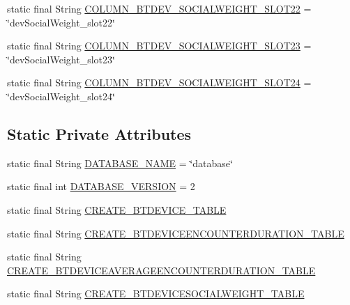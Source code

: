 \begin{DoxyCompactItemize}
\item 
static final String \hyperlink{classcom_1_1copelabs_1_1oiframework_1_1socialproximity_1_1_s_q_lite_helper_a7ae9acaa31f9a48270d4bdc82813f92d}{C\+O\+L\+U\+M\+N\+\_\+\+B\+T\+D\+E\+V\+\_\+\+S\+O\+C\+I\+A\+L\+W\+E\+I\+G\+H\+T\+\_\+\+S\+L\+O\+T22} = \char`\"{}dev\+Social\+Weight\+\_\+slot22\char`\"{}
\item 
static final String \hyperlink{classcom_1_1copelabs_1_1oiframework_1_1socialproximity_1_1_s_q_lite_helper_a157c831d9d5e35ae9d963ab45eda3bda}{C\+O\+L\+U\+M\+N\+\_\+\+B\+T\+D\+E\+V\+\_\+\+S\+O\+C\+I\+A\+L\+W\+E\+I\+G\+H\+T\+\_\+\+S\+L\+O\+T23} = \char`\"{}dev\+Social\+Weight\+\_\+slot23\char`\"{}
\item 
static final String \hyperlink{classcom_1_1copelabs_1_1oiframework_1_1socialproximity_1_1_s_q_lite_helper_ad7fa2e7b604ae30b2e345db407eda23d}{C\+O\+L\+U\+M\+N\+\_\+\+B\+T\+D\+E\+V\+\_\+\+S\+O\+C\+I\+A\+L\+W\+E\+I\+G\+H\+T\+\_\+\+S\+L\+O\+T24} = \char`\"{}dev\+Social\+Weight\+\_\+slot24\char`\"{}
\end{DoxyCompactItemize}
\subsection*{Static Private Attributes}
\begin{DoxyCompactItemize}
\item 
static final String \hyperlink{classcom_1_1copelabs_1_1oiframework_1_1socialproximity_1_1_s_q_lite_helper_afa3a735c5e28deefbe78a9bd333a7604}{D\+A\+T\+A\+B\+A\+S\+E\+\_\+\+N\+A\+M\+E} = \char`\"{}database\char`\"{}
\item 
static final int \hyperlink{classcom_1_1copelabs_1_1oiframework_1_1socialproximity_1_1_s_q_lite_helper_a91052155e9397b8ef410c989e7115b77}{D\+A\+T\+A\+B\+A\+S\+E\+\_\+\+V\+E\+R\+S\+I\+O\+N} = 2
\item 
static final String \hyperlink{classcom_1_1copelabs_1_1oiframework_1_1socialproximity_1_1_s_q_lite_helper_a58ab16602f201829b8fa1e85fc9d52d9}{C\+R\+E\+A\+T\+E\+\_\+\+B\+T\+D\+E\+V\+I\+C\+E\+\_\+\+T\+A\+B\+L\+E}
\item 
static final String \hyperlink{classcom_1_1copelabs_1_1oiframework_1_1socialproximity_1_1_s_q_lite_helper_ae34d36729919fc443f01068723578fa2}{C\+R\+E\+A\+T\+E\+\_\+\+B\+T\+D\+E\+V\+I\+C\+E\+E\+N\+C\+O\+U\+N\+T\+E\+R\+D\+U\+R\+A\+T\+I\+O\+N\+\_\+\+T\+A\+B\+L\+E}
\item 
static final String \hyperlink{classcom_1_1copelabs_1_1oiframework_1_1socialproximity_1_1_s_q_lite_helper_a7c3a3362d1860f645cee13b28ddccee3}{C\+R\+E\+A\+T\+E\+\_\+\+B\+T\+D\+E\+V\+I\+C\+E\+A\+V\+E\+R\+A\+G\+E\+E\+N\+C\+O\+U\+N\+T\+E\+R\+D\+U\+R\+A\+T\+I\+O\+N\+\_\+\+T\+A\+B\+L\+E}
\item 
static final String \hyperlink{classcom_1_1copelabs_1_1oiframework_1_1socialproximity_1_1_s_q_lite_helper_a707bd95f431fe1ef0833da31f30cfb94}{C\+R\+E\+A\+T\+E\+\_\+\+B\+T\+D\+E\+V\+I\+C\+E\+S\+O\+C\+I\+A\+L\+W\+E\+I\+G\+H\+T\+\_\+\+T\+A\+B\+L\+E}
\end{DoxyCompactItemize}


